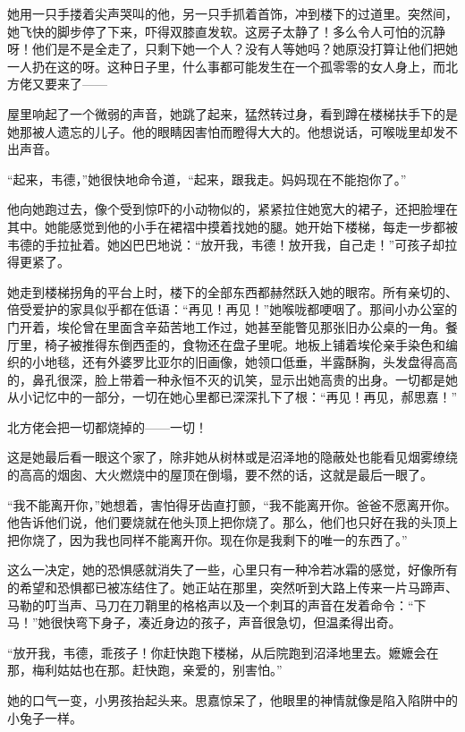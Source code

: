 \par 她用一只手搂着尖声哭叫的他，另一只手抓着首饰，冲到楼下的过道里。突然间，她飞快的脚步停了下来，吓得双膝直发软。这房子太静了！多么令人可怕的沉静呀！他们是不是全走了，只剩下她一个人？没有人等她吗？她原没打算让他们把她一人扔在这的呀。这种日子里，什么事都可能发生在一个孤零零的女人身上，而北方佬又要来了——
\par 屋里响起了一个微弱的声音，她跳了起来，猛然转过身，看到蹲在楼梯扶手下的是她那被人遗忘的儿子。他的眼睛因害怕而瞪得大大的。他想说话，可喉咙里却发不出声音。
\par “起来，韦德，”她很快地命令道，“起来，跟我走。妈妈现在不能抱你了。”
\par 他向她跑过去，像个受到惊吓的小动物似的，紧紧拉住她宽大的裙子，还把脸埋在其中。她能感觉到他的小手在裙褶中摸着找她的腿。她开始下楼梯，每走一步都被韦德的手拉扯着。她凶巴巴地说：“放开我，韦德！放开我，自己走！”可孩子却拉得更紧了。
\par 她走到楼梯拐角的平台上时，楼下的全部东西都赫然跃入她的眼帘。所有亲切的、倍受爱护的家具似乎都在低语：“再见！再见！”她喉咙都哽咽了。那间小办公室的门开着，埃伦曾在里面含辛茹苦地工作过，她甚至能瞥见那张旧办公桌的一角。餐厅里，椅子被推得东倒西歪的，食物还在盘子里呢。地板上铺着埃伦亲手染色和编织的小地毯，还有外婆罗比亚尔的旧画像，她领口低垂，半露酥胸，头发盘得高高的，鼻孔很深，脸上带着一种永恒不灭的讥笑，显示出她高贵的出身。一切都是她从小记忆中的一部分，一切在她心里都已深深扎下了根：“再见！再见，郝思嘉！”
\par 北方佬会把一切都烧掉的——一切！
\par 这是她最后看一眼这个家了，除非她从树林或是沼泽地的隐蔽处也能看见烟雾缭绕的高高的烟囱、大火燃烧中的屋顶在倒塌，要不然的话，这就是最后一眼了。
\par “我不能离开你，”她想着，害怕得牙齿直打颤，“我不能离开你。爸爸不愿离开你。他告诉他们说，他们要烧就在他头顶上把你烧了。那么，他们也只好在我的头顶上把你烧了，因为我也同样不能离开你。现在你是我剩下的唯一的东西了。”
\par 这么一决定，她的恐惧感就消失了一些，心里只有一种冷若冰霜的感觉，好像所有的希望和恐惧都已被冻结住了。她正站在那里，突然听到大路上传来一片马蹄声、马勒的叮当声、马刀在刀鞘里的格格声以及一个刺耳的声音在发着命令：“下马！”她很快弯下身子，凑近身边的孩子，声音很急切，但温柔得出奇。
\par “放开我，韦德，乖孩子！你赶快跑下楼梯，从后院跑到沼泽地里去。嬷嬷会在那，梅利姑姑也在那。赶快跑，亲爱的，别害怕。”
\par 她的口气一变，小男孩抬起头来。思嘉惊呆了，他眼里的神情就像是陷入陷阱中的小兔子一样。
